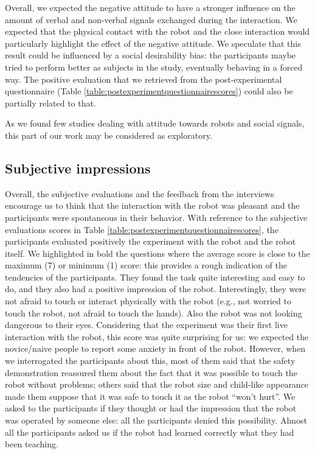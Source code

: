 Overall, we expected the negative attitude to have a stronger influence on the amount of verbal and non-verbal signals exchanged during the interaction. 
We expected that the physical contact with the robot and the close interaction would particularly highlight the effect of the negative attitude. 
We speculate that this result could be influenced by a social desirability bias: the participants maybe tried to perform better as subjects in the study, eventually behaving in a forced way. The positive evaluation that we retrieved from the post-experimental questionnaire (Table \ref{table:postexperimentquestionnairescores}) could also be partially related to that.

As we found few studies dealing with attitude towards robots and social signals, this part of our work may be considered as exploratory.


\subsection{Subjective impressions}

Overall, the subjective evaluations and the feedback from the interviews encourage us to think that the interaction with the robot was pleasant and the participants were spontaneous in their behavior.
With reference to the subjective evaluations scores in Table \ref{table:postexperimentquestionnairescores}, the participants evaluated positively the experiment with the robot and the robot itself. We highlighted in bold the questions where the average score is close to the maximum (7) or minimum (1) score: this provides a rough indication of the tendencies of the participants.
They found the task quite interesting and easy to do, and they also had a positive impression of the robot.  
Interestingly, they were not afraid to touch or interact physically with the robot (e.g., not worried to touch the robot, not afraid to touch the hands). Also the robot was not looking dangerous to their eyes.
Considering that the experiment was their first live interaction with the robot, this score was quite surprising for us: we expected the novice/naive people to report some anxiety in front of the robot. However, when we interrogated the participants about this, most of them said that the safety demonstration reassured them about the fact that it was possible to touch the robot without problems; others said that the robot size and child-like appearance made them suppose that it was safe to touch it as the robot ``won't hurt''.
We asked to the participants if they thought or had the impression that the robot was operated by someone else: all the participants denied this possibility. Almost all the participants asked us if the robot had learned correctly what they had been teaching.


